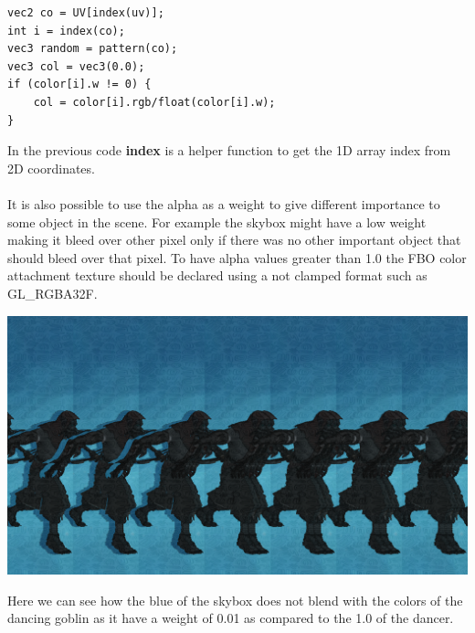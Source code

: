 \documentclass[12pt, a4paper]{article}
\begin{document}
\begin{lstlisting}[caption={Second pass color blending},captionpos=b]
vec2 co = UV[index(uv)];
int i = index(co);
vec3 random = pattern(co);
vec3 col = vec3(0.0);
if (color[i].w != 0) {
    col = color[i].rgb/float(color[i].w);
}
\end{lstlisting}
In the previous code \textbf{index} is a helper function to get the 1D array index from 2D coordinates.\\\\
It is also possible to use the alpha as a weight to give different importance to some object in the scene. For example the skybox might have a low weight
making it bleed over other pixel only if there was no other important object that should bleed over that pixel.
To have alpha values greater than 1.0 the FBO color attachment texture should be declared using a not clamped format such as GL\_RGBA32F.
\begin{center}
    \centering
    \includegraphics[width=1.0\textwidth]{img/dance.png}
\end{center}
Here we can see how the blue of the skybox does not blend with the colors of the dancing goblin as it have a weight of 0.01 as compared to the
1.0 of the dancer.
\end{document}
